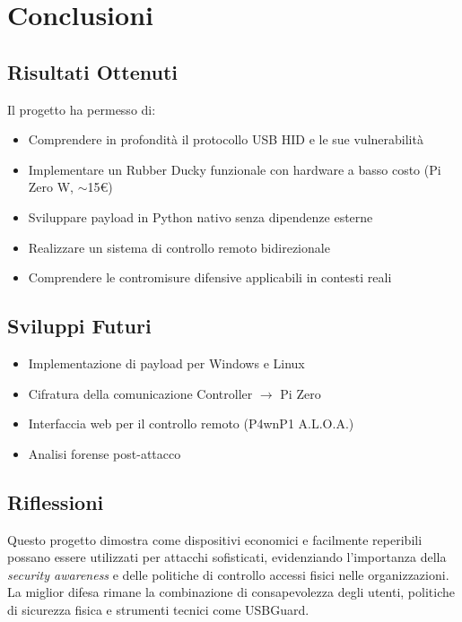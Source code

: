 \documentclass[12pt,a4paper]{article}
\begin{document}
\newpage

\section{Conclusioni}

\subsection{Risultati Ottenuti}
Il progetto ha permesso di:
\begin{itemize}
    \item Comprendere in profondità il protocollo USB HID e le sue vulnerabilità
    \item Implementare un Rubber Ducky funzionale con hardware a basso costo (Pi Zero W, $\sim$15€)
    \item Sviluppare payload in Python nativo senza dipendenze esterne
    \item Realizzare un sistema di controllo remoto bidirezionale
    \item Comprendere le contromisure difensive applicabili in contesti reali
\end{itemize}

\subsection{Sviluppi Futuri}
\begin{itemize}
    \item Implementazione di payload per Windows e Linux
    \item Cifratura della comunicazione Controller $\rightarrow$ Pi Zero
    \item Interfaccia web per il controllo remoto (P4wnP1 A.L.O.A.)
    \item Analisi forense post-attacco
\end{itemize}

\subsection{Riflessioni}
Questo progetto dimostra come dispositivi economici e facilmente reperibili possano
essere utilizzati per attacchi sofisticati, evidenziando l'importanza della
\textit{security awareness} e delle politiche di controllo accessi fisici
nelle organizzazioni. La miglior difesa rimane la combinazione di
consapevolezza degli utenti, politiche di sicurezza fisica e strumenti
tecnici come USBGuard.
\end{document}
